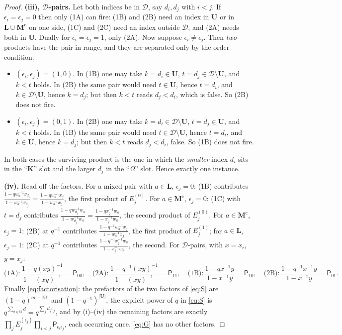 \documentclass[11pt]{article}
\theoremstyle{plain}
\theoremstyle{definition}
\theoremstyle{remark}
\newcommand{\bM}{\mathbf M}
\newcommand{\bK}{\mathbf K}
\newcommand{\bL}{\mathbf L}
\newcommand{\bU}{\mathbf U}
\newcommand{\cD}{\mathcal D}
\newcommand{\cm}{{\mathrm c}}
\newcommand{\Om}{\Omega}
\begin{document}
\begin{proof}
\textbf{(iii), $\cD$-pairs.} Let both indices be in $\cD$, say $d_i,d_j$ with
$i<j$. If $\epsilon_i=\epsilon_j=0$ then only (1A) can fire: (1B) and (2B) need an
index in $\bU$ or in $\bL\cup\bM^\cm$ on one side, (1C) and (2C) need an index
outside $\cD$, and (2A) needs both in $\bU$. Dually for
$\epsilon_i=\epsilon_j=1$, only (2A). Now suppose $\epsilon_i\ne\epsilon_j$. Then
\emph{two} products have the pair in range, and they are separated only by the
order condition:
\begin{itemize}[leftmargin=1.4em,itemsep=1pt]
\item $(\epsilon_i,\epsilon_j)=(1,0)$. In (1B) one may take $k=d_i\in\bU$,
$t=d_j\in\cD\setminus\bU$, and $k<t$ holds. In (2B) the same pair would need
$t\in\bU$, hence $t=d_i$, and $k\in\cD\setminus\bU$, hence $k=d_j$; but then $k<t$
reads $d_j<d_i$, which is false. So (2B) does not fire.
\item $(\epsilon_i,\epsilon_j)=(0,1)$. In (2B) one may take
$k=d_i\in\cD\setminus\bU$, $t=d_j\in\bU$, and $k<t$ holds. In (1B) the same pair
would need $t\in\cD\setminus\bU$, hence $t=d_i$, and $k\in\bU$, hence $k=d_j$; but
then $k<t$ reads $d_j<d_i$, false. So (1B) does not fire.
\end{itemize}
In both cases the surviving product is the one in which the \emph{smaller} index
$d_i$ sits in the ``$\bK$'' slot and the larger $d_j$ in the ``$\Om$'' slot. Hence
exactly one instance.

\textbf{(iv).} Read off the factors. For a mixed pair with $a\in\bL$,
$\epsilon_j=0$: (1B) contributes
$\frac{1-qw_a^{-1}w_{d_j}}{1-w_a^{-1}w_{d_j}}=\frac{1-qw_a^{-1}x_j}{1-w_a^{-1}x_j}$,
the first product of $E_j^{(0)}$. For $a\in\bM^\cm$, $\epsilon_j=0$: (1C) with
$t=d_j$ contributes
$\frac{1-qw_{d_j}^{-1}w_a}{1-w_{d_j}^{-1}w_a}=\frac{1-qx_j^{-1}w_a}{1-x_j^{-1}w_a}$,
the second product of $E_j^{(0)}$. For $a\in\bM^\cm$, $\epsilon_j=1$: (2B) at
$q^{-1}$ contributes $\frac{1-q^{-1}w_a^{-1}x_j}{1-w_a^{-1}x_j}$, the first product
of $E_j^{(1)}$; for $a\in\bL$, $\epsilon_j=1$: (2C) at $q^{-1}$ contributes
$\frac{1-q^{-1}x_j^{-1}w_a}{1-x_j^{-1}w_a}$, the second. For $\cD$-pairs, with
$x=x_i$, $y=x_j$:
\[
\text{(1A)}:\frac{1-q(xy)^{-1}}{1-(xy)^{-1}}=\mathsf P_{00},\quad
\text{(2A)}:\frac{1-q^{-1}(xy)^{-1}}{1-(xy)^{-1}}=\mathsf P_{11},\quad
\text{(1B)}:\frac{1-qx^{-1}y}{1-x^{-1}y}=\mathsf P_{10},\quad
\text{(2B)}:\frac{1-q^{-1}x^{-1}y}{1-x^{-1}y}=\mathsf P_{01}.
\]
Finally \eqref{eq:factorisation}: the prefactors of the two factors of \eqref{eq:S}
are $(1-q)^{m-|\bU|}$ and $(1-q^{-1})^{|\bU|}$, the explicit power of $q$ in
\eqref{eq:S} is $q^{\sum_{d\in\bU}d}=q^{\sum_j d_j\epsilon_j}$, and by (i)--(iv)
the remaining factors are exactly
$\prod_j E_j^{(\epsilon_j)}\prod_{i<j}\mathsf P_{\epsilon_i\epsilon_j}$, each
occurring once. \eqref{eq:G} has no other factors.
\end{proof}
\end{document}
